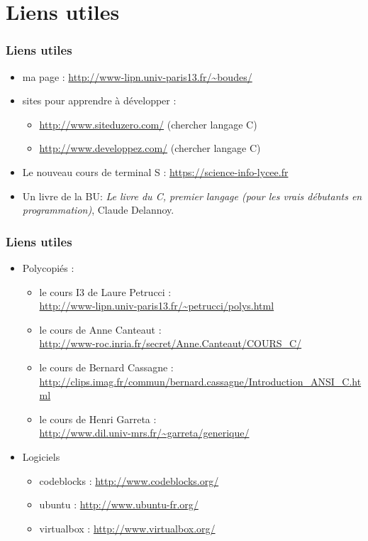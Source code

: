 \documentclass[xcolor=svgnames]{beamer}
\begin{document}
\section[Références]{Liens utiles}
\begin{frame}
\frametitle{Liens utiles\nowrite}

  \begin{itemize}
\item ma page : \url{http://www-lipn.univ-paris13.fr/~boudes/}
\item sites pour apprendre à développer :
  \begin{itemize}
  \item \url{http://www.siteduzero.com/} (chercher langage C)
  \item \url{http://www.developpez.com/} (chercher langage C)
  \end{itemize}
\item Le nouveau cours de terminal S :
  \url{https://science-info-lycee.fr}
\item Un livre de la BU: \emph{Le livre du C, premier langage (pour les
  vrais débutants en programmation)}, Claude Delannoy.
  \end{itemize}
\end{frame}

\begin{frame}
\frametitle{Liens utiles\nowrite}
\begin{itemize}
\item Polycopiés :
  \begin{itemize}
  \item le cours I3 de Laure Petrucci :\\
    {\small\url{http://www-lipn.univ-paris13.fr/~petrucci/polys.html}}
  \item le cours de Anne Canteaut :\\
    {\small\url{http://www-roc.inria.fr/secret/Anne.Canteaut/COURS_C/}}
  \item le cours de Bernard Cassagne :\\
    {\small\url{http://clips.imag.fr/commun/bernard.cassagne/Introduction_ANSI_C.html}}
  \item le cours de Henri Garreta : \\
    {\small\url{http://www.dil.univ-mrs.fr/~garreta/generique/}}
  \end{itemize}
\item Logiciels
  \begin{itemize}
  \item codeblocks : \url{http://www.codeblocks.org/}
  \item ubuntu : \url{http://www.ubuntu-fr.org/}
  \item virtualbox : \url{http://www.virtualbox.org/}
  \end{itemize}
  \end{itemize}
\end{frame}
\end{document}
